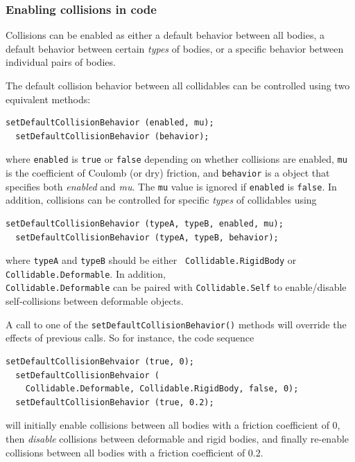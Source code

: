 
\subsubsection{Enabling collisions in code}

Collisions can be enabled as either a default behavior between all
bodies, a default behavior between certain {\it types} of
bodies, or a specific behavior between individual pairs of bodies.

The default collision behavior between all collidables can be
controlled using two equivalent methods:
%
\begin{lstlisting}[]
  setDefaultCollisionBehavior (enabled, mu);
  setDefaultCollisionBehavior (behavior);
\end{lstlisting}
%
where {\tt enabled} is {\tt true} or {\tt false} depending on whether
collisions are enabled, {\tt mu} is the coefficient of Coulomb (or
dry) friction, and {\tt behavior} is a
 object that
specifies both {\it enabled} and {\it mu}. The {\tt mu} value is
ignored if {\tt enabled} is {\tt false}.  In addition, collisions can
be controlled for specific {\it types} of collidables using
%
\begin{lstlisting}[]
  setDefaultCollisionBehavior (typeA, typeB, enabled, mu);
  setDefaultCollisionBehavior (typeA, typeB, behavior);
\end{lstlisting}
%
where {\tt typeA} and {\tt typeB} should be either {\tt
Collidable.RigidBody} or {\tt Collidable.Deformable}.  In addition,\\
{\tt Collidable.Deformable} can be paired with {\tt Collidable.Self} to
enable/disable self-collisions between deformable objects.

A call to one of the {\tt setDefaultCollisionBehavior()} methods will
override the effects of previous calls. So for instance, the code
sequence
%
\begin{lstlisting}[]
  setDefaultCollisionBehvaior (true, 0);
  setDefaultCollisionBehvaior (
    Collidable.Deformable, Collidable.RigidBody, false, 0);
  setDefaultCollisionBehavior (true, 0.2);
\end{lstlisting}
%
will initially enable collisions between all bodies with a friction
coefficient of 0, then {\it disable} collisions between deformable and
rigid bodies, and finally re-enable collisions between all bodies with
a friction coefficient of 0.2.

